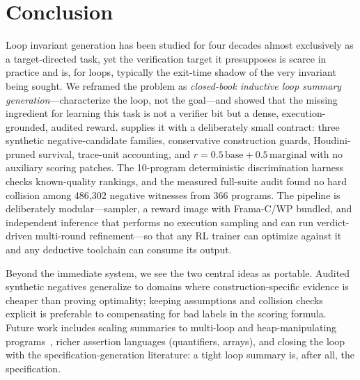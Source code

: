 \section{Conclusion}\label{sec:conclusion}

Loop invariant generation has been studied for four decades almost exclusively as a target-directed task, yet the verification target it presupposes is scarce in practice and is, for loops, typically the exit-time shadow of the very invariant being sought.
We reframed the problem as \emph{closed-book inductive loop summary generation}---characterize the loop, not the goal---and showed that the missing ingredient for learning this task is not a verifier bit but a dense, execution-grounded, audited reward.
\sam{} supplies it with a deliberately small contract: three synthetic negative-candidate families, conservative construction guards, Houdini-pruned survival, trace-unit accounting, and $r=0.5\,\mathrm{base}+0.5\,\mathrm{marginal}$ with no auxiliary scoring patches.  The 10-program deterministic discrimination harness checks known-quality rankings, and the measured full-suite audit found no hard collision among 486,302 negative witnesses from 366 programs.
The pipeline is deliberately modular---sampler, a reward image with Frama-C/WP bundled, and independent inference that performs no execution sampling and can run verdict-driven multi-round refinement---so that any RL trainer can optimize against it and any deductive toolchain can consume its output.

Beyond the immediate system, we see the two central ideas as portable.
Audited synthetic negatives generalize to domains where construction-specific evidence is cheaper than proving optimality; keeping assumptions and collision checks explicit is preferable to compensating for bad labels in the scoring formula.
Future work includes scaling summaries to multi-loop and heap-manipulating programs~\citep{liu2024towards}, richer assertion languages (quantifiers, arrays), and closing the loop with the specification-generation literature: a tight loop summary is, after all, the specification.
